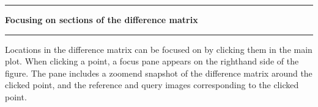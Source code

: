 \noindent\rule{\textwidth}{1pt}
\indent \textbf{Focusing on sections of the difference matrix}
\noindent\rule{\textwidth}{1pt}
\smallskip
\parbox{\textwidth}{Locations in the difference matrix can be focused on by clicking them in the main plot. When clicking a point, a focus pane appears on the righthand side of the figure. The pane includes a zoomend snapshot of the difference matrix around the clicked point, and the reference and query images corresponding to the clicked point.}
\smallskip
